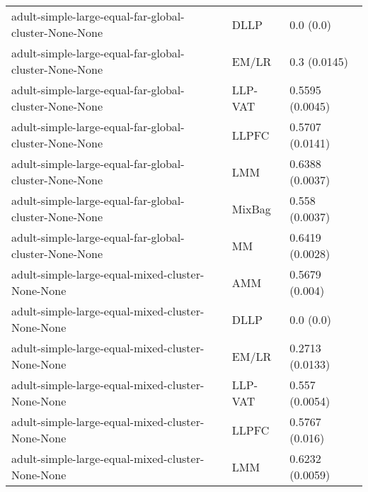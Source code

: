 \begin{longtable}{lll}
                                                        adult-simple-large-equal-far-global-cluster-None-None &      DLLP &                                 0.0 (0.0) \\
                                                        adult-simple-large-equal-far-global-cluster-None-None &     EM/LR &                              0.3 (0.0145) \\
                                                        adult-simple-large-equal-far-global-cluster-None-None &   LLP-VAT &                           0.5595 (0.0045) \\
                                                        adult-simple-large-equal-far-global-cluster-None-None &     LLPFC &                           0.5707 (0.0141) \\
                                                        adult-simple-large-equal-far-global-cluster-None-None &       LMM &                           0.6388 (0.0037) \\
                                                        adult-simple-large-equal-far-global-cluster-None-None &    MixBag &                            0.558 (0.0037) \\
                                                        adult-simple-large-equal-far-global-cluster-None-None &        MM &                           0.6419 (0.0028) \\
                                                             adult-simple-large-equal-mixed-cluster-None-None &       AMM &                            0.5679 (0.004) \\
                                                             adult-simple-large-equal-mixed-cluster-None-None &      DLLP &                                 0.0 (0.0) \\
                                                             adult-simple-large-equal-mixed-cluster-None-None &     EM/LR &                           0.2713 (0.0133) \\
                                                             adult-simple-large-equal-mixed-cluster-None-None &   LLP-VAT &                            0.557 (0.0054) \\
                                                             adult-simple-large-equal-mixed-cluster-None-None &     LLPFC &                            0.5767 (0.016) \\
                                                             adult-simple-large-equal-mixed-cluster-None-None &       LMM &                           0.6232 (0.0059) \\

\end{longtable}
